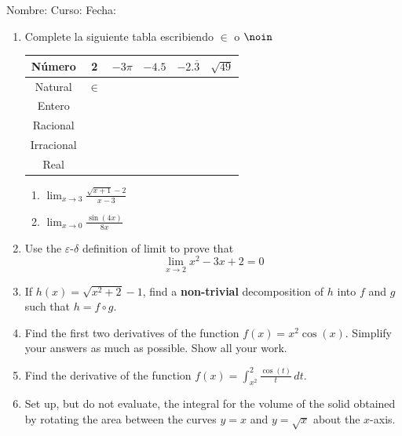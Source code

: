 \documentclass[fleqn]{article}
\newcommand{\LineaNombre}{%
\par
\vspace{\baselineskip}
Nombre:\hrulefill \; Curso: \underline{\hspace*{36pt}} \; Fecha: \underline{\hspace*{2.5cm}} \relax
\par}
\let\ds\displaystyle
\begin{document}
\LineaNombre
\begin{enumerate}
   \item Complete la siguiente tabla escribiendo $\in$ o $\noin$
\begin{center}
   \begin{tabular}{|c|c|c|c|c|c|}
\hline 
Número & 2 & $-3\pi$ & $-4.5$ & $-2.\overline{3}$ & $\sqrt{49}$ \\ 
\hline 
Natural & $\in$ &  &  &  &  \\ 
\hline 
Entero &  &  &  &  &  \\ 
\hline 
Racional &  &  &  &  &  \\ 
\hline 
Irracional &  &  &  &  &  \\ 
\hline 
Real &  &  &  &  &  \\ 
\hline 
\end{tabular} 
\end{center}
      \begin{enumerate}
	 \item $\ds{\lim_{x\rightarrow3}\frac{\sqrt{x+1} - 2}{x-3}}$\answer
	 \item $\ds{\lim_{x\rightarrow0}\frac{\sin(4x)}{8x}}$\answer
      \end{enumerate}
   \item Use the $\varepsilon$-$\delta$ definition of limit to prove that 
      \[\lim_{x\rightarrow 2} x^2 - 3x + 2 = 0\]\noanswer[2.5in]
      \newpage
   \item If $h(x) = \sqrt{x^2 + 2} - 1$, find a \textbf{non-trivial} decomposition of $h$ into $f$ and $g$ such that $h = f\circ g$.
   \item Find the first two derivatives of the function $f(x) = x^2\cos(x)$.  Simplify
      your answers as much as possible.  Show all your work.
      \newpage
   \item Find the derivative of the function $\ds{f(x) = \int_{x^2}^2
      \frac{\cos(t)}{t} \,dt}$.
   \item Set up, but do not evaluate, the integral for the volume of the solid obtained by rotating the area between the curves $y = x$ and $y = \sqrt{x}$ about the $x$-axis.\noanswer
\end{enumerate}
\end{document}
